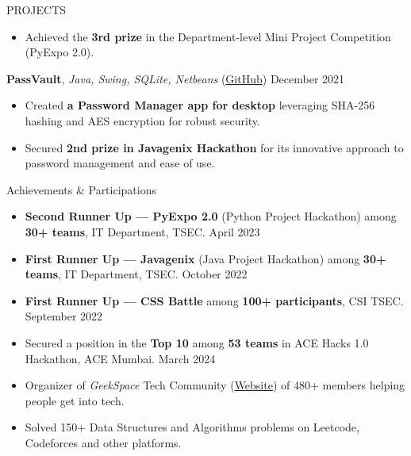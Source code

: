 \documentclass{resume} %
\begin{document}
\begin{rSection}{PROJECTS}
\begin{itemize}
        \item Achieved the \textbf{3rd prize} in the Department-level Mini Project Competition (PyExpo 2.0).
    \end{itemize}
    \item \textbf{PassVault}, \textit{Java, Swing, SQLite, Netbeans} (\href{https://github.com/ninadnaik10/PassVault} {GitHub}) \hfill {December 2021}
    \begin{itemize}
        \setlength\itemsep{-0.6em}
        \item Created \textbf{a Password Manager app for desktop} leveraging SHA-256 hashing and AES encryption for robust security.
        \item Secured \textbf{2nd prize in Javagenix Hackathon} for its innovative approach to password management and ease of use.
    \end{itemize}

\end{rSection}

\begin{rSection}{Achievements \& Participations}
    \begin{itemize}
        \setlength\itemsep{-0.6em}
        \item \textbf{Second Runner Up — PyExpo 2.0} (Python Project Hackathon) among \textbf{30+ teams}, IT Department, TSEC. \hfill {April 2023}
        \item \textbf{First Runner Up — Javagenix} (Java Project Hackathon) among \textbf{30+ teams}, IT Department, TSEC. \hfill {October 2022}
        \item \textbf{First Runner Up — CSS Battle} among \textbf{100+ participants}, CSI TSEC. \hfill {September 2022}
        \item Secured a position in the \textbf{Top 10} among \textbf{53 teams} in ACE Hacks 1.0 Hackathon, ACE Mumbai. \hfill{March 2024}
        \item Organizer of \textit{GeekSpace} Tech Community (\href{https://geekspaceclub.xyz}{Website}) of 480+ members helping people get into tech.
        \item Solved 150+ Data Structures and Algorithms problems on Leetcode, Codeforces and other platforms.
    \end{itemize}


\end{rSection}



\end{document}
